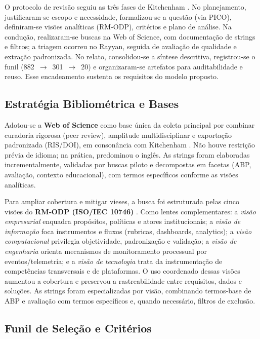 \documentclass[12pt,a4paper]{article}
\begin{document}
O protocolo de revisão seguiu as três fases de Kitchenham \cite{kitchenham2004}. No planejamento, justificaram-se escopo e necessidade, formalizou-se a questão (via PICO), definiram-se visões analíticas (RM‑ODP), critérios e plano de análise. Na condução, realizaram-se buscas na Web of Science, com documentação de strings e filtros; a triagem ocorreu no Rayyan, seguida de avaliação de qualidade e extração padronizada. No relato, consolidou-se a síntese descritiva, registrou-se o funil (882 \,$\to$\, 301 \,$\to$\, 20) e organizaram-se artefatos para auditabilidade e reuso. Esse encadeamento sustenta os requisitos do modelo proposto.

\subsection{Estratégia Bibliométrica e Bases}

Adotou‑se a \textbf{Web of Science} como base única da coleta principal por combinar curadoria rigorosa (peer review), amplitude multidisciplinar e exportação padronizada (RIS/DOI), em consonância com Kitchenham \cite{kitchenham2004}. Não houve restrição prévia de idioma; na prática, predominou o inglês. As strings foram elaboradas incrementalmente, validadas por buscas piloto e decompostas em facetas (ABP, avaliação, contexto educacional), com termos específicos conforme as visões analíticas.

Para ampliar cobertura e mitigar vieses, a busca foi estruturada pelas cinco visões do \textbf{RM‑ODP (ISO/IEC 10746)} \cite{iso10746}. Como lentes complementares: a \emph{visão empresarial} enquadra propósitos, políticas e atores institucionais; a \emph{visão de informação} foca instrumentos e fluxos (rubricas, dashboards, analytics); a \emph{visão computacional} privilegia objetividade, padronização e validação; a \emph{visão de engenharia} orienta mecanismos de monitoramento processual por eventos/telemetria; e a \emph{visão de tecnologia} trata da instrumentação de competências transversais e de plataformas. O uso coordenado dessas visões aumentou a cobertura e preservou a rastreabilidade entre requisitos, dados e soluções. As strings foram especializadas por visão, combinando termos‑base de ABP e avaliação com termos específicos e, quando necessário, filtros de exclusão.

\subsection{Funil de Seleção e Critérios}
\end{document}
